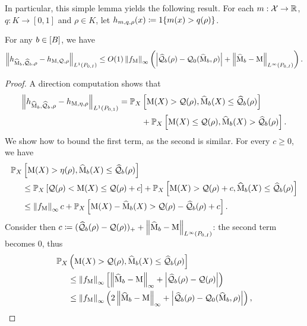 In particular, this simple lemma yields the following result.
For each $m : \mathcal{X} \to \mathbb{R}$, $q: K \to [0,1]$ and $\rho \in K$, let $h_{m,q, \rho}(x) \coloneqq 1\!\left\{ m(x) > q(\rho)\right\}$. 
\begin{lemma}
\label{lem:bound-h-indicator}
For any $b \in [B]$, we have
\begin{align*}
\left\|{ h_{\widehat{\operatorname*{M}}_b, \widehat{\mathcal{Q}}_b, \rho} - h_{\operatorname*{M}, \mathcal{Q}, \rho}}\right\|_{L^1(P_{0,I})} \le O(1)\left\|{f_{\operatorname*{M}}}\right\|_\infty\left(  \left| \widehat{\mathcal{Q}}_b(\rho) - \mathcal{Q}_0(\widehat{\operatorname*{M}}_b, \rho) \right| + \left\|{\widehat{\operatorname*{M}}_b - \operatorname*{M}}\right\|_{L^\infty(P_{0,I})} \right).
\end{align*}
\end{lemma}
\begin{proof} 
A direction computation shows that
\begin{align*}
\begin{split}
\left\|{ h_{\widehat{\operatorname*{M}}_b, \widehat{\mathcal{Q}}_b, \rho} - h_{\operatorname*{M}, \eta, \rho}}\right\|_{L^1(P_{0,1})} = \mathbb{P}_X&\left[ \operatorname*{M}(X) > \mathcal{Q}(\rho), \widehat{\operatorname*{M}}_b(X) \le \widehat{\mathcal{Q}}_b(\rho) \right] \\
&+ \mathbb{P}_X\left[ \operatorname*{M}(X) \le \mathcal{Q}(\rho), \widehat{\operatorname*{M}}_b(X) > \widehat{\mathcal{Q}}_b(\rho) \right].
\end{split}
\end{align*}
We show how to bound the first term, as the second is similar.
For every $c \ge 0$, we have
\begin{align*}
\mathbb{P}_X &\left[ \operatorname*{M}(X) > \eta(\rho), \widehat{\operatorname*{M}}_b(X) \le \widehat{\mathcal{Q}}_b(\rho) \right] \\
&\le
 \mathbb{P}_{X} \left[ \mathcal{Q}(\rho) < \operatorname*{M}(X) \le \mathcal{Q}(\rho) + c \right]
 +  \mathbb{P}_{X} \left[ \operatorname*{M}(X) > \mathcal{Q}(\rho) + c, 
\widehat{\operatorname*{M}}_b(X) \le \widehat{\mathcal{Q}}_b(\rho) \right] 
\\
&\le \left\|{f_{\operatorname*{M}}}\right\|_\infty c +  \mathbb{P}_{X}\left[ \operatorname*{M}(X) - \widehat{\operatorname*{M}}_b(X) > \mathcal{Q}(\rho) - \widehat{\mathcal{Q}}_b(\rho) + c \right].
\end{align*}
Consider then $c \coloneqq (\widehat{\mathcal{Q}}_b(\rho) - \mathcal{Q}(\rho))_+ +  \left\|{ \widehat{\operatorname*{M}}_b - \operatorname*{M}}\right\|_{L^\infty(P_{0,I})}$: the second term becomes $0$,  thus
\begin{align*}
\P_{X} &\left( \MC(X) > \qfunc(\rho),  \what \MC_\batch(X) \le \what \qfunc_\batch(\rho) \right]  \\
&\le \norm{f_{\MC}}_\infty \left[  \norm{ \what \MC_\batch - \MC}_{\infty} + \left|\what \qfunc_\batch(\rho) - \qfunc(\rho) \right| \right) \\
&\le \norm{f_{\MC}}_\infty \left( 2\norm{ \what \MC_\batch - \MC}_{\infty} + \left|\what \qfunc_\batch(\rho) - \qfunc_0(\what \MC_\batch, \rho) \right| \right),

\end{align*}
\end{proof}
